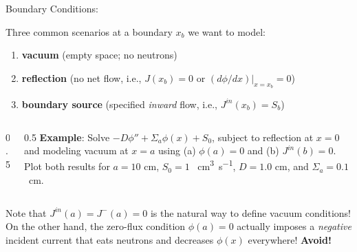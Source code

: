 \documentclass[aspectratio=1610]{beamer}
\begin{document}
\begin{frame}[fragile]{Boundary Conditions: }

Three common scenarios at a boundary $x_b$
we want to model: 

\begin{enumerate}
 \item {\bf vacuum} (empty space; no neutrons)
 \item {\bf reflection} (no net flow, i.e., $J(x_b) = 0$ or $(d\phi/dx)|_{x=x_b} = 0$)
 \item {\bf boundary source} (specified {\it inward} flow, i.e., $J^{in}(x_b) = S_b$)
\end{enumerate}

\begin{columns}[T]

\begin{column}{0.5\textwidth}

\resizebox{0.99\textwidth}{!}{}

\end{column}

\begin{column}{0.5\textwidth}
{\small {\bf Example}: Solve $-D\phi'' + \Sigma_a \phi(x) + S_0$, subject to reflection at $x = 0$ and modeling vacuum at $x=a$ using (a) $\phi(a)=0$ and (b)  $J^{in}(b) = 0$. Plot both results for $a = 10$ cm, $S_0 = 1$ \si{\per\centi\meter\cubed\per\second}, $D = 1.0$ cm, and $\Sigma_a = 0.1$ \si{\per\centi\meter}.}
\end{column}

\end{columns}

Note that $J^{in}(a) = J^-(a) = 0$ is the natural way to define vacuum conditions!  On the other hand, the zero-flux condition $\phi(a)=0$ actually imposes a {\it negative} incident current that eats neutrons and decreases $\phi(x)$ everywhere! {\bf Avoid!}


\end{frame}
\end{document}
